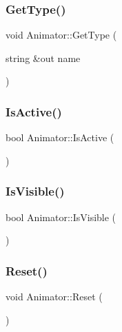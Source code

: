 \subsubsection{\texorpdfstring{Get\+Type()}{GetType()}}
{\footnotesize\ttfamily void Animator\+::\+Get\+Type (\begin{DoxyParamCaption}\item[{string \&out}]{name }\end{DoxyParamCaption})}

\hypertarget{class_animator_a148a35b4c15123c7fcbe50c2b9327aa0}{}\label{class_animator_a148a35b4c15123c7fcbe50c2b9327aa0} 
\subsubsection{\texorpdfstring{Is\+Active()}{IsActive()}}
{\footnotesize\ttfamily bool Animator\+::\+Is\+Active (\begin{DoxyParamCaption}{ }\end{DoxyParamCaption})}

\hypertarget{class_animator_a488b4b9cb26862e1a42246ef84d74ce5}{}\label{class_animator_a488b4b9cb26862e1a42246ef84d74ce5} 
\subsubsection{\texorpdfstring{Is\+Visible()}{IsVisible()}}
{\footnotesize\ttfamily bool Animator\+::\+Is\+Visible (\begin{DoxyParamCaption}{ }\end{DoxyParamCaption})}

\hypertarget{class_animator_a1cc8d341473488a6a68c7972e26871e8}{}\label{class_animator_a1cc8d341473488a6a68c7972e26871e8} 
\subsubsection{\texorpdfstring{Reset()}{Reset()}}
{\footnotesize\ttfamily void Animator\+::\+Reset (\begin{DoxyParamCaption}{ }\end{DoxyParamCaption})}

\hypertarget{class_animator_adfe6040e5d819aa50794b21caed8dbc1}{}\label{class_animator_adfe6040e5d819aa50794b21caed8dbc1} 
